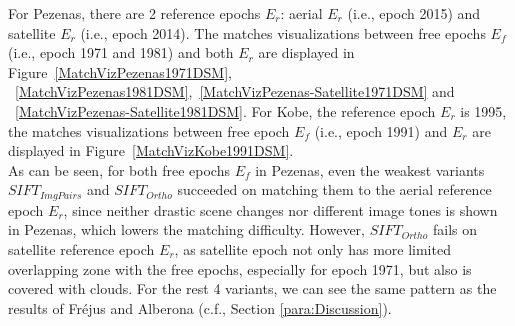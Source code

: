 For Pezenas, there are 2 reference epochs $E_r$: aerial $E_r$ (i.e., epoch 2015) and satellite $E_r$ (i.e., epoch 2014). The matches visualizations between free epochs $E_f$ (i.e., epoch 1971 and 1981) and both $E_r$ are displayed in Figure~\ref{MatchVizPezenas1971DSM}, ~\ref{MatchVizPezenas1981DSM},~\ref{MatchVizPezenas-Satellite1971DSM} and ~\ref{MatchVizPezenas-Satellite1981DSM}. For Kobe, the reference epoch $E_r$ is 1995, the matches visualizations between free epoch $E_f$ (i.e., epoch 1991) and $E_r$ are displayed in Figure~\ref{MatchVizKobe1991DSM}.\\
As can be seen, for both free epochs $E_f$ in Pezenas, even the weakest variants $SIFT_{ImgPairs}$ and $SIFT_{Ortho}$ succeeded on matching them to the aerial reference epoch $E_r$, since neither drastic scene changes nor different image tones is shown in Pezenas, which lowers the matching difficulty. However, $SIFT_{Ortho}$ fails on satellite reference epoch $E_r$, as satellite epoch not only has more limited overlapping zone with the free epochs, especially for epoch 1971, but also is covered with clouds. For the rest 4 variants, we can see the same pattern as the results of Fr{\'e}jus and Alberona (c.f., Section \ref{para:Discussion}).
